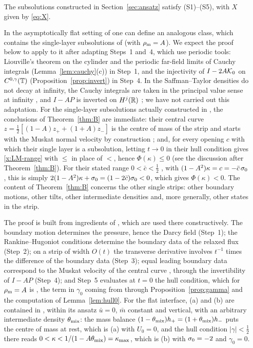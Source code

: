 The subsolutions constructed in Section~\ref{sec:ansatz} satisfy (S1)--(S5), with $X$ given by \eqref{eq:X}.

In the asymptotically flat setting of \cite{LM26} one can define an analogous class, which contains the single-layer subsolutions of \cite{LM26} (with $\rho_{\mathrm m}=A$). We expect the proof below to
apply to it after adapting Steps~1 and~4, which use periodic tools: Liouville's theorem on the cylinder and the periodic far-field limits of Cauchy integrals (Lemma~\ref{lem:cauchy}(c)) in Step~1,
and the injectivity of $I-2A\mathcal{K}_0$ on $C^{0,\gamma}(\mathbb{T})$ (Proposition~\ref{prop:invert}) in Step~4. In \cite{LM26} the Saffman--Taylor densities do not decay at infinity, the Cauchy integrals are
taken in the principal value sense at infinity \cite[Sec.~3.3.2]{LM26}, and $I-AP$ is inverted on $H^j(\mathbb{R})$ \cite[Prop.~6.1]{LM26}; we have not carried out this adaptation. For the single-layer
subsolutions actually constructed in \cite{LM26}, the conclusions of Theorem~\ref{thm:B} are immediate: their central curve $z=\frac12[(1-A)z_++(1+A)z_-]$ is the centre of mass of the strip and
starts with the Muskat normal velocity by construction \cite[Sec.~3.3.4 and Lemma~5.2]{LM26}; and, for every opening $c$ with which their single layer is a subsolution, letting $t\to0$ in
their hull condition \cite[(4.14)]{LM26} gives \eqref{x:LM-range} with $\le$ in place of $<$, hence $\Phi(\kappa)\le0$ (see the discussion after Theorem~\ref{thm:B}). For their stated range
$0<\bar c<\frac12$ \cite[(7.13)]{LM26}, with $(1-A^2)\kappa=c=-\bar c\,\sigma_0$, this is simply $2(1-A^2)\kappa+\sigma_0=(1-2\bar c)\sigma_0<0$, which gives $\Phi(\kappa)<0$. The content of
Theorem~\ref{thm:B} concerns the other single strips: other boundary motions, other tilts, other intermediate densities and, more generally, other states in the strip.

The proof is built from ingredients of \cite{LM26}, which are used there constructively. The boundary motion determines the pressure, hence the Darcy field \cite[Sec.~3.3.2]{LM26} (Step~1);
the Rankine--Hugoniot conditions determine the boundary data of the relaxed flux \cite[Sec.~3.3.1 and (4.12)]{LM26} (Step~2); on a strip of width $O(t)$ the transverse derivative involves $t^{-1}$
times the difference of the boundary data \cite[Sec.~3.3.4]{LM26} (Step~3); equal leading boundary data correspond to the Muskat velocity of the central curve \cite[Lemma~5.2]{LM26}, through the
invertibility of $I-AP$ \cite[Prop.~6.1]{LM26} (Step~4); and Step~5 evaluates at $t=0$ the hull condition, which for $\rho_{\mathrm m}=A$ is \cite[(4.14)]{LM26}, the term in $\gamma_0$ coming from
\cite[(3.7b)]{LM26} through Proposition~\ref{prop:gamma} and the computation of Lemma~\ref{lem:hull0}. For the flat interface, (a) and (b) are contained in \cite[Sec.~3.2]{LM26}, within its ansatz $\bar u=0$, $\bar m$ constant and vertical, with an
arbitrary intermediate density $\theta_{\rm mix}$: the mass balance $(1-\theta_{\rm mix})h_+=(1+\theta_{\rm mix})h_-$ puts the centre of mass at rest, which is (a) with $U_0=0$, and the hull
condition $|\gamma|<\frac12$ there reads $0<\kappa<1/(1-A\theta_{\rm mix})=\kappa_{\max}$, which is (b) with $\sigma_0=-2$ and $\gamma_0=0$.

